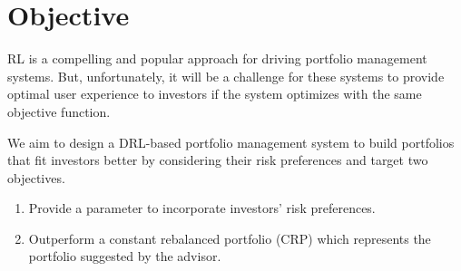 \section{Objective}
\label{c:objective}
RL is a compelling and popular approach for driving portfolio management systems. But, unfortunately, it will be a challenge for these systems to provide optimal user experience to investors if the system optimizes with the same objective function.

We aim to design a DRL-based portfolio management system to build portfolios that fit investors better by considering their risk preferences and target two objectives.
\begin{enumerate}
    \item  Provide a parameter to incorporate investors' risk preferences.
    \item Outperform a constant rebalanced portfolio (CRP) which represents the portfolio suggested by the advisor. 
\end{enumerate}

